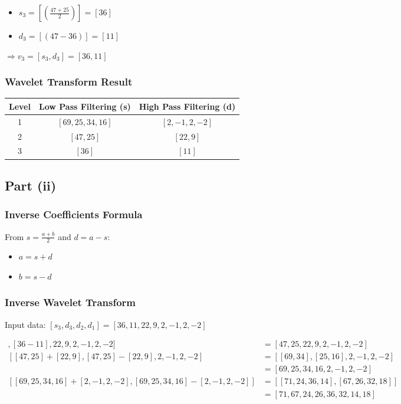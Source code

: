 \documentclass[12pt]{article}
\begin{document}
\begin{itemize}
    \item $s_3 = [(\frac{47 + 25}{2})] = [36]$
    \item $d_3 = [(47-36)]  = [11]$
\end{itemize}

$\Rightarrow v_3 = [s_3, d_3] = [36, 11]$

\subsubsection{Wavelet Transform Result}
\textbf{}
\begin{center}
\begin{tabular}{|c|c|c|}
\hline
\textbf{Level} & \textbf{Low Pass Filtering (s)} & \textbf{High Pass Filtering (d)} \\
\hline
1 & $[69, 25, 34, 16]$ & $[2, -1, 2, -2]$ \\
2 & $[47, 25]$ & $[22, 9]$ \\
3 & $[36]$ & $[11]$ \\
\hline
\end{tabular}
\end{center}

\subsection{Part (ii)}

\subsubsection{Inverse Coefficients Formula}

From $s = \frac{a + b}{2}$ and $d = a - s$:
\begin{itemize}
    \item $a = s + d$
    \item $b = s - d$
\end{itemize}

\subsubsection{Inverse Wavelet Transform}

Input data: $[s_3, d_3, d_2, d_1] = [36, 11, 22, 9, 2, -1, 2, -2]$ 

\begin{align*}
[[36+11], [36-11], 22, 9, 2, -1, 2, -2] &= [47, 25, 22, 9, 2, -1, 2, -2] \\
[[47, 25]+[22, 9], [47, 25]-[22, 9], 2, -1, 2, -2]
&= [[69, 34], [25, 16], 2, -1, 2, -2] \\
&= [69, 25, 34, 16, 2, -1, 2, -2] \\
[[69, 25, 34, 16]+[2, -1, 2, -2], [69, 25, 34, 16]-[2, -1, 2, -2]] 
&= [[71, 24, 36, 14], [67, 26, 32, 18]] \\
&= [71, 67, 24, 26, 36, 32, 14, 18]
\end{align*}
\end{document}
